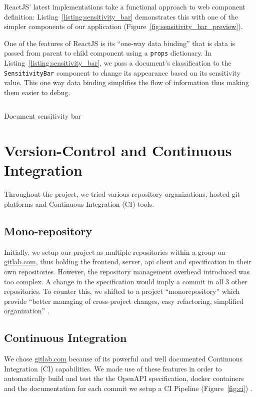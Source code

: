 \documentclass[\version]{l4proj}
\begin{document}
ReactJS' latest implementations take a functional approach to web component definition: Listing~\ref{listing:sensitivity_bar} demonstrates this with one of the simpler components of our application (Figure~\ref{fig:sensitivity_bar_preview}).

One of the features of ReactJS is its ``one-way data binding'' that is data is passed from parent to child component using a \verb|props| dictionary.
In Listing~\ref{listing:sensitivity_bar}, we pass a document's classification to the \verb|SensitivityBar| component to change its appearance based on its sensitivity value.
This one way data binding simplifies the flow of information thus making them easier to debug.


\begin{listing}[H]
    \inputminted{jsx}{code/documentSensitivityBar.js}
    \caption{Document sensitivity bar}\label{listing:sensitivity_bar}
\end{listing}

\section{Version-Control and Continuous Integration}

Throughout the project, we tried various repository organizations, hosted git platforms and Continuous Integration (CI) tools.


\subsection{Mono-repository}

Initially, we setup our project as multiple repositories within a group on \href{https://gitlab.com/harpocrates-app}{gitlab.com}, thus holding the frontend, server, api client and specification in their own repositories.
However, the repository management overhead introduced was too complex. A change in the specification would imply a commit in all 3 other repositories.
To counter this, we shifted to a project ``monorepository'' which provide ``better managing of cross-project changes, easy refactoring, simplified organization'' \autocite[1]{britoMonoreposMultivocalLiterature2018}.

\subsection{Continuous Integration}

We chose \href{https://gitlab.com/}{gitlab.com} because of its powerful and well documented Continuous Integration (CI) capabilities.
We made use of these features in order to automatically build and test the the OpenAPI specification, docker containers and the documentation for each commit we setup a CI Pipeline (Figure~\ref{fig:ci}) .
\end{document}
